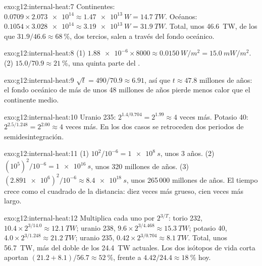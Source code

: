 \begin{solution}{exo:g12:internal-heat:7}
Continentes: $0.0709 \times \num{2.073e14} \approx \qty{1.47e13}{W} =
\qty{14.7}{TW}$. Océanos: $0.1054 \times \num{3.028e14} \approx
\qty{3.19e13}{W} = \qty{31.9}{TW}$. Total, unos \qty{46.6}{TW}, de los que
$31.9/46.6 \approx \qty{68}{\percent}$, dos tercios, salen a través del fondo
oceánico.
\end{solution}

\begin{solution}{exo:g12:internal-heat:8}
(1) $\num{1.88e-6} \times 8000 \approx \qty{0.0150}{W/m^2} = \qty{15.0}{mW/m^2}$.
(2) $15.0/70.9 \approx \qty{21}{\percent}$, una quinta parte del .
\end{solution}

\begin{solution}{exo:g12:internal-heat:9}
$\sqrt{t} = 490/70.9 \approx 6.91$, así que $t \approx 47.8$ millones de
años: el fondo oceánico de más de unos 48 millones de años pierde menos calor
que el continente medio.
\end{solution}

\begin{solution}{exo:g12:internal-heat:10}
Uranio 235: $2^{1.4/0.704} = 2^{1.99} \approx 4$ veces más. Potasio 40:
$2^{2.5/1.248} = 2^{2.00} \approx 4$ veces más. En los dos casos se retroceden
dos periodos de semidesintegración.
\end{solution}

\begin{solution}{exo:g12:internal-heat:11}
(1) $10^2/10^{-6} = \qty{1e8}{s}$, unos 3 años. (2) $(10^5)^2/10^{-6} =
\qty{1e16}{s}$, unos 320 millones de años. (3) $(\num{2.891e6})^2/10^{-6}
\approx \qty{8.4e18}{s}$, unos 265\,000 millones de años. El tiempo crece
como el cuadrado de la distancia: diez veces más grueso, cien veces más
largo.
\end{solution}

\begin{solution}{exo:g12:internal-heat:12}
Multiplica cada uno por $2^{3/T}$: torio 232, $10.4 \times 2^{3/14.0} \approx
\qty{12.1}{TW}$; uranio 238, $9.6 \times 2^{3/4.468} \approx \qty{15.3}{TW}$;
potasio 40, $4.0 \times 2^{3/1.248} \approx \qty{21.2}{TW}$; uranio 235,
$0.42 \times 2^{3/0.704} \approx \qty{8.1}{TW}$. Total, unos \qty{56.7}{TW},
más del doble de los \qty{24.4}{TW} actuales. Los dos isótopos de vida corta
aportan $(21.2 + 8.1)/56.7 \approx \qty{52}{\percent}$, frente a
$4.42/24.4 \approx \qty{18}{\percent}$ hoy.
\end{solution}

